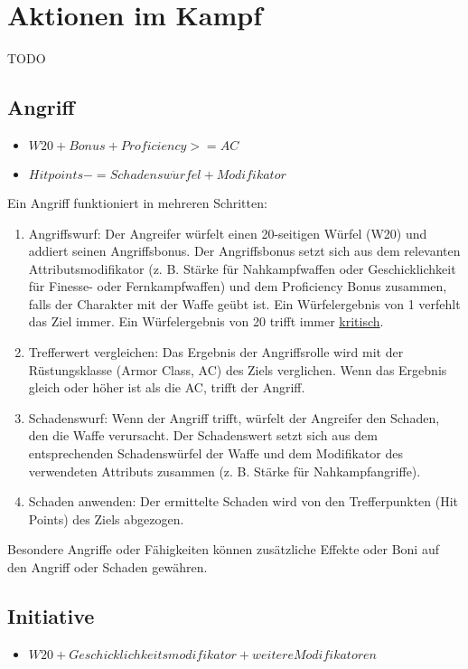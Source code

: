 \chapter{Aktionen im Kampf}
TODO

\section{Angriff}
\begin{itemize}
\item $W20 + Bonus + Proficiency >= AC$

\item $Hitpoints -= Schadensw\ddot{u}rfel + Modifikator$
\end{itemize}

Ein Angriff funktioniert in mehreren Schritten:

\begin{enumerate}

\item Angriffswurf: Der Angreifer würfelt einen 20-seitigen Würfel (W20) und addiert seinen Angriffsbonus. Der Angriffsbonus setzt sich aus dem relevanten Attributsmodifikator (z. B. Stärke für Nahkampfwaffen oder Geschicklichkeit für Finesse- oder Fernkampfwaffen) und dem Proficiency Bonus zusammen, falls der Charakter mit der Waffe geübt ist. Ein Würfelergebnis von 1 verfehlt das Ziel immer. Ein Würfelergebnis von 20 trifft immer \hyperref[sec:crit]{kritisch}.
\item Trefferwert vergleichen: Das Ergebnis der Angriffsrolle wird mit der Rüstungsklasse (Armor Class, AC) des Ziels verglichen. Wenn das Ergebnis gleich oder höher ist als die AC, trifft der Angriff.
\item Schadenswurf: Wenn der Angriff trifft, würfelt der Angreifer den Schaden, den die Waffe verursacht. Der Schadenswert setzt sich aus dem entsprechenden Schadenswürfel der Waffe und dem Modifikator des verwendeten Attributs zusammen (z. B. Stärke für Nahkampfangriffe).
\item Schaden anwenden: Der ermittelte Schaden wird von den Trefferpunkten (Hit Points) des Ziels abgezogen.
\end{enumerate}
Besondere Angriffe oder Fähigkeiten können zusätzliche Effekte oder Boni auf den Angriff oder Schaden gewähren.

\section{Initiative}
\begin{itemize}
\item $W20 + Geschicklichkeitsmodifikator + weitere Modifikatoren$
\end{itemize}

